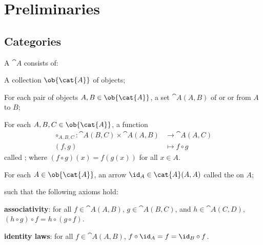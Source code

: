 \section{Preliminaries}








\subsection{Categories}

\begin{definition}
  A  $\cat{A}$ consists of:
  \begin{enumarabic}
    \item A collection $\ob{\cat{A}}$ of objects;
    \item For each pair of objects $A,B\in\ob{\cat{A}}$, a set
      $\cat{A}(A,B)$ of  or 
      or  from $A$ to $B$;
    \item For each $A, B, C \in \ob{\cat{A}}$, a function
      \begin{align*}
        \circ_{A,B,C} : \cat{A}(B,C) \times \cat{A}(A,B) &\to \cat{A}(A,C) \\
        (f,g) &\mapsto f \circ g
      \end{align*}
      called ;
      where $(f \circ g)(x) = f(g(x))$ for all $x \in A$.
    \item For each $A \in \ob{\cat{A}}$, an arrow
      $\id_A \in \cat{A}(A,A)$ called the  on $A$;
  \end{enumarabic}
  such that the following axioms hold:
  \begin{enumarabic}
    \item \textbf{associativity}: for all $f \in \cat{A}(A,B)$,
      $g \in \cat{A}(B,C)$, and $h \in \cat{A}(C,D)$,
      $(h \circ g) \circ f = h \circ (g \circ f)$.
    \item \textbf{identity laws}: for all $f \in \cat{A}(A,B)$,
        $f \circ \id_A = f = \id_B \circ f$.
  \end{enumarabic}
\end{definition}

